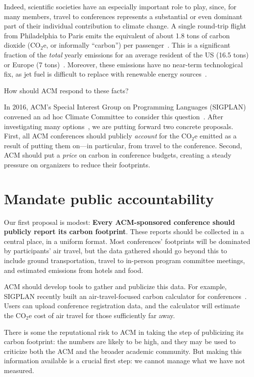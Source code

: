 \documentclass[12pt]{article}
\newcommand{\COtwoE}{CO$_2$e}
\newcommand{\SECTION}{\section*}
\begin{document}
Indeed, scientific societies have an especially important role to
play, since, for many members, travel to conferences represents a
substantial or even dominant part of their individual contribution to
climate change.  A single round-trip flight from Philadelphia to Paris emits
the equivalent of about 1.8 tons of carbon dioxide (\COtwoE, or informally
``carbon'') per
passenger~\cite{ClimateCommittee}. This is a significant fraction of the
{\em total} yearly emissions for an average resident of the US (16.5 tons)
or Europe (7 tons)~\cite{emissions}.
Moreover, these emissions have no near-term technological
fix, as jet fuel is difficult to replace with renewable energy
sources~\cite{elec-air}.

How should ACM respond to these facts?

In 2016, ACM's Special
Interest Group on Programming Languages (SIGPLAN) convened an ad hoc Climate
Committee to consider this question~\cite{ClimateCommittee}.  After
investigating many options~\cite{ClimateCommitteReport}, we are putting
forward two concrete proposals. First, all ACM
conferences should publicly {\em account} for the {\COtwoE} emitted as a
result of putting them on---in particular, from travel to
the conference. Second, ACM should put a \emph{price} on
carbon in conference budgets, creating a steady pressure on organizers to reduce
their footprints.

\SECTION{Mandate public accountability}

Our first proposal is modest: {\bf Every ACM-sponsored conference should
publicly report its carbon footprint}.
%
These reports should be collected in a central place, in a uniform format.
Most conferences' footprints will be dominated by participants' air travel,
but the data gathered should go beyond this to include ground
transportation, travel to in-person program committee meetings, and
estimated emissions from hotels and food.

ACM should develop tools to gather and publicize this data.  For example,
SIGPLAN recently built an air-travel-focused carbon calculator for
conferences~\cite{ClimateCommittee}.  Users can upload conference
registration data, and the calculator will estimate the {\COtwoE} cost of
air travel for those sufficiently far away.

There is some the reputational risk to ACM in taking the step of publicizing
its carbon footprint: the numbers are likely to be high, and they may be
used to criticize both the ACM and the broader academic community.  But
making this information available is a crucial first step: we cannot manage
what we have not measured.
\end{document}
